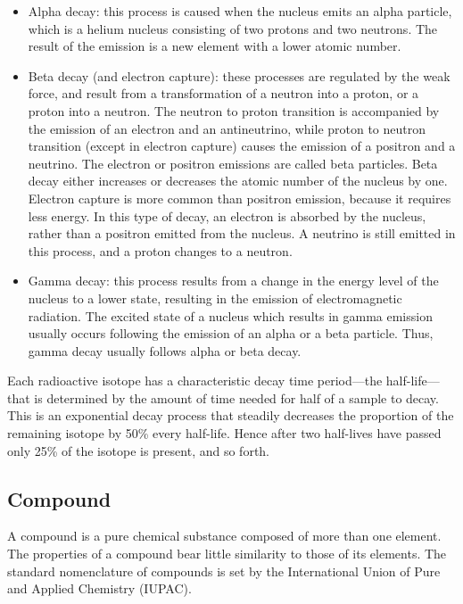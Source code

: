 \documentclass[
]{article}
\providecommand{\tightlist}{%
  \setlength{\itemsep}{0pt}\setlength{\parskip}{0pt}}
\begin{document}
\begin{itemize}
\tightlist
\item
  Alpha decay: this process is caused when the nucleus emits an alpha
  particle, which is a helium nucleus consisting of two protons and two
  neutrons. The result of the emission is a new element with a lower
  atomic number.
\item
  Beta decay (and electron capture): these processes are regulated by
  the weak force, and result from a transformation of a neutron into a
  proton, or a proton into a neutron. The neutron to proton transition
  is accompanied by the emission of an electron and an antineutrino,
  while proton to neutron transition (except in electron capture) causes
  the emission of a positron and a neutrino. The electron or positron
  emissions are called beta particles. Beta decay either increases or
  decreases the atomic number of the nucleus by one. Electron capture is
  more common than positron emission, because it requires less energy.
  In this type of decay, an electron is absorbed by the nucleus, rather
  than a positron emitted from the nucleus. A neutrino is still emitted
  in this process, and a proton changes to a neutron.
\item
  Gamma decay: this process results from a change in the energy level of
  the nucleus to a lower state, resulting in the emission of
  electromagnetic radiation. The excited state of a nucleus which
  results in gamma emission usually occurs following the emission of an
  alpha or a beta particle. Thus, gamma decay usually follows alpha or
  beta decay.
\end{itemize}

Each radioactive isotope has a characteristic decay time period---the
half-life---that is determined by the amount of time needed for half of
a sample to decay. This is an exponential decay process that steadily
decreases the proportion of the remaining isotope by 50\% every
half-life. Hence after two half-lives have passed only 25\% of the
isotope is present, and so forth.

\hypertarget{compound}{%
\subsection{Compound}\label{compound}}

A compound is a pure chemical substance composed of more than one
element. The properties of a compound bear little similarity to those of
its elements. The standard nomenclature of compounds is set by the
International Union of Pure and Applied Chemistry (IUPAC).
\end{document}
